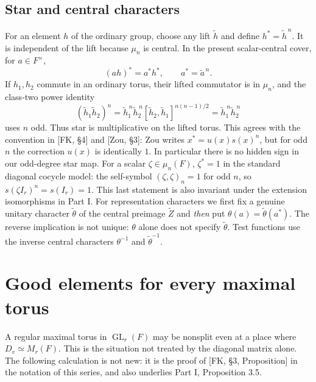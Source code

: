 \documentclass[11pt]{article}
\newcommand{\GL}{\operatorname{GL}}
\newcommand{\tZ}{\widetilde Z}
\theoremstyle{plain}
\theoremstyle{definition}
\begin{document}
\subsection{Star and central characters}\label{subsec:star}
For an element $h$ of the ordinary group, choose any lift
$\widetilde h$ and define $h^*=\widetilde h^{\,n}$.  It is
independent of the lift because $\mu_n$ is central.  In the present
scalar-central cover, for $a\in F^\times$,
\begin{equation}\label{eq:starcentral}
 (ah)^*=a^*h^*,\qquad a^*=\widetilde a^{\,n}.
\end{equation}
If $h_1,h_2$ commute in an ordinary torus, their lifted commutator
is in $\mu_n$, and the class-two power identity
\begin{equation}\label{eq:starpower}
 (\widetilde h_1\widetilde h_2)^n
 =\widetilde h_1^{\,n}\widetilde h_2^{\,n}
 [\widetilde h_2,\widetilde h_1]^{n(n-1)/2}
 =\widetilde h_1^{\,n}\widetilde h_2^{\,n}
\end{equation}
uses $n$ odd.  Thus star is multiplicative on the lifted torus.
This agrees with the convention in [FK, \S4] and [Zou, \S3]:
Zou writes $x^*=u(x)s(x)^n$, but for odd $n$ the correction
$u(x)$ is identically $1$.  In particular there is no hidden
sign in our odd-degree star map.  For a scalar $\zeta\in\mu_n(F)$,
$\zeta^*=1$ in the standard diagonal cocycle model: the
self-symbol $(\zeta,\zeta)_n=1$ for odd $n$, so
$s(\zeta I_r)^n=s(I_r)=1$.  This last statement is also
invariant under the extension isomorphisms in Part I.
For representation characters we first fix a genuine unitary
character $\widetilde\theta$ of the central preimage $\tZ$ and
\emph{then} put $\theta(a)=\widetilde\theta(a^*)$.
The reverse implication is not unique: $\theta$ alone does not
specify $\widetilde\theta$.  Test functions use the inverse
central characters $\theta^{-1}$ and $\widetilde\theta^{-1}$.

\section{Good elements for every maximal torus}\label{sec:good}
A regular maximal torus in $\GL_r(F)$ may be nonsplit even at a
place where $D_v\simeq M_r(F)$.  This is the situation not treated by
the diagonal matrix alone.  The following calculation is not new:
it is the proof of [FK, \S3, Proposition] in the notation of this
series, and also underlies Part I, Proposition 3.5.
\end{document}
